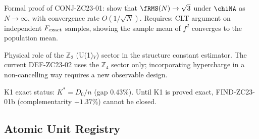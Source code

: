\documentclass[12pt, a4paper]{article}
\begin{document}
\begin{openqbox}[title={Open Items after TASK-ZC23}]
\begin{description}[leftmargin=2.5cm, style=nextline, noitemsep]
  \item[\textsc{Thm-ZC23-01}]
    Formal proof of CONJ-ZC23-01: show that $\fRMS(N)\to\sqrt{3}$
    under $\chiNA$ as $N\to\infty$, with convergence rate $O(1/\sqrt{N})$.
    Requires: CLT argument on independent $F_{\rm exact}$ samples,
    showing the sample mean of $f^2$ converges to the population mean.

  \item[\textsc{Open-ZC23-U1}]
    Physical role of the $\mathbb{Z}_2$ (U(1)$_Y$) sector in the
    structure constant estimator. The current DEF-ZC23-02 uses the
    $\mathbb{Z}_4$ sector only; incorporating hypercharge in a
    non-cancelling way requires a new observable design.

  \item[\textsc{Open-ZC23-K1}]
    K1 exact status: $K^* = D_0/n$ (gap $0.43\%$).
    Until K1 is proved exact, FIND-ZC23-01b
    (complementarity $+1.37\%$) cannot be closed.
\end{description}
\end{openqbox}

\subsection{Atomic Unit Registry}
\label{zc23:sec:registry}
\end{document}
